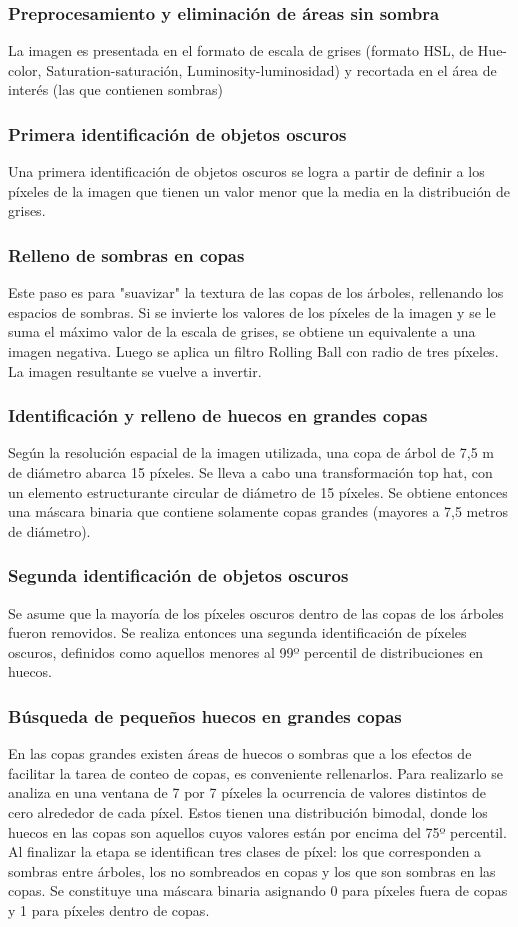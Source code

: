\subsubsection{Preprocesamiento y eliminación de áreas sin sombra}
La imagen es presentada en el formato de escala de grises (formato HSL, de Hue-color, Saturation-saturación, Luminosity-luminosidad) y recortada en el área de interés (las que contienen sombras)
\subsubsection{Primera identificación de objetos oscuros}
Una primera identificación de objetos oscuros se logra a partir de definir a los píxeles de la imagen que tienen un valor menor que la media en la distribución de grises.
\subsubsection{Relleno de sombras en copas}
Este paso es para "suavizar" la textura de las copas de los árboles, rellenando los espacios de sombras.
Si se invierte los valores de los píxeles de la imagen y se le suma el máximo valor de la escala de grises, se obtiene un equivalente a una imagen negativa. Luego se aplica un filtro Rolling Ball con radio de tres píxeles. La imagen resultante se vuelve a invertir.
\subsubsection{Identificación y relleno de huecos en grandes copas}
Según la resolución espacial de la imagen utilizada, una copa de árbol de 7,5 m de diámetro abarca 15 píxeles. Se lleva a cabo una transformación top hat, con un elemento estructurante circular de diámetro de 15 píxeles. Se obtiene entonces una máscara binaria que contiene solamente copas grandes (mayores a 7,5 metros de diámetro).
\subsubsection{ Segunda identificación de objetos oscuros}
Se asume que la mayoría de los píxeles oscuros dentro de las copas de los árboles fueron removidos. Se realiza entonces una segunda identificación de píxeles oscuros, definidos como aquellos menores al 99º percentil de distribuciones en huecos.
\subsubsection{Búsqueda de pequeños huecos en grandes copas}
En las copas grandes existen áreas de huecos o sombras que a los efectos de facilitar la tarea de conteo de copas, es conveniente rellenarlos. Para realizarlo se analiza en una ventana de 7 por 7 píxeles la ocurrencia de valores distintos de cero alrededor de cada píxel. Estos tienen una distribución bimodal, donde los huecos en las copas son aquellos cuyos valores están por encima del 75º percentil. Al finalizar la etapa se identifican tres clases de píxel: los que corresponden a sombras entre árboles, los no sombreados en copas y los que son sombras en las copas. Se constituye una máscara binaria asignando 0 para píxeles fuera de copas y 1 para píxeles dentro de copas.
